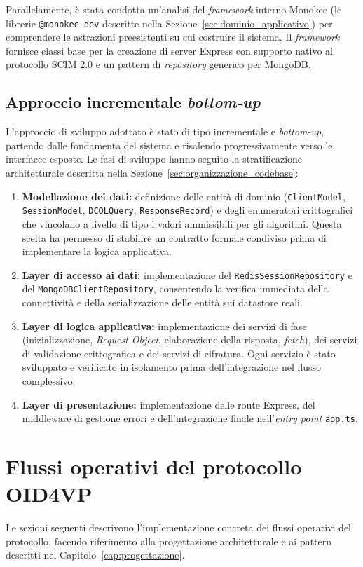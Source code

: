 Parallelamente, è stata condotta un'analisi del \textit{framework} interno Monokee (le librerie \texttt{@monokee-\allowbreak{}dev} descritte nella Sezione~\ref{sec:dominio_applicativo}) per comprendere le astrazioni preesistenti su cui costruire il sistema. Il \textit{framework} fornisce classi base per la creazione di server Express con supporto nativo al protocollo SCIM 2.0 e un pattern di \textit{repository} generico per MongoDB.

\subsection{Approccio incrementale \textit{bottom-up}}
L'approccio di sviluppo adottato è stato di tipo incrementale e \textit{bottom-up}, partendo dalle fondamenta del sistema e risalendo progressivamente verso le interfacce esposte. Le fasi di sviluppo hanno seguito la stratificazione architetturale descritta nella Sezione~\ref{sec:organizzazione_codebase}:

\begin{enumerate}
    \item \textbf{Modellazione dei dati:} definizione delle entità di dominio (\texttt{ClientModel}, \texttt{SessionModel}, \texttt{DCQLQuery}, \texttt{ResponseRecord}) e degli enumeratori crittografici che vincolano a livello di tipo i valori ammissibili per gli algoritmi. Questa scelta ha permesso di stabilire un contratto formale condiviso prima di implementare la logica applicativa.
    \item \textbf{Layer di accesso ai dati:} implementazione del \texttt{RedisSessionRepository} e del \texttt{MongoDBClientRepository}, consentendo la verifica immediata della connettività e della serializzazione delle entità sui datastore reali.
    \item \textbf{Layer di logica applicativa:} implementazione dei servizi di fase (inizializzazione, \textit{Request Object}, elaborazione della risposta, \textit{fetch}), dei servizi di validazione crittografica e dei servizi di cifratura. Ogni servizio è stato sviluppato e verificato in isolamento prima dell'integrazione nel flusso complessivo.
    \item \textbf{Layer di presentazione:} implementazione delle route Express, del middleware di gestione errori e dell'integrazione finale nell'\textit{entry point} \texttt{app.ts}.
\end{enumerate}

\section{Flussi operativi del protocollo OID4VP}
Le sezioni seguenti descrivono l'implementazione concreta dei flussi operativi del protocollo, facendo riferimento alla progettazione architetturale e ai pattern descritti nel Capitolo~\ref{cap:progettazione}.

